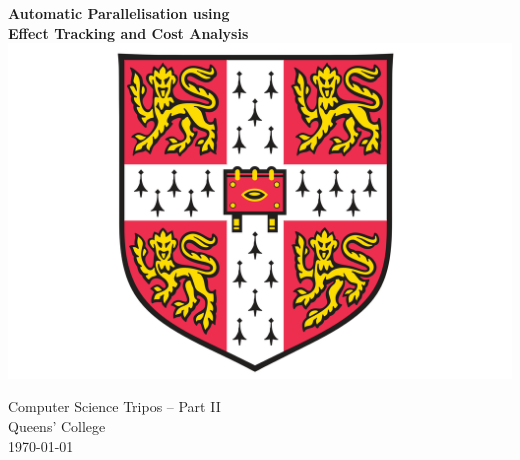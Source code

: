 \documentclass[12pt,a4paper,twoside,openright]{report}
\begin{document}



\pagestyle{empty}


\vspace*{30mm}
\begin{center}
	\Huge
	\textbf{Automatic Parallelisation using \\ Effect Tracking and Cost Analysis} \\[20mm]

	\vspace{-2mm}
	\includegraphics[scale=0.5]{./figures/crest.png}
	\hspace{0mm}\\[20mm]
	\vspace{2mm}


	\LARGE
	Computer Science Tripos -- Part II \\[1mm]
	Queens' College \\[20mm]

	\Large
	\today
\end{center}

\newpage
\thispagestyle{empty}


\pagestyle{plain}

\end{document}
